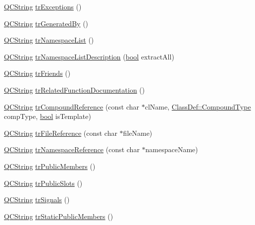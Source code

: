 \begin{DoxyCompactItemize}
\hyperlink{class_q_c_string}{Q\+C\+String} \hyperlink{class_translator_dutch_a09d71e3b824a70eb9fd4c82767b0999c}{tr\+Exceptions} ()
\item 
\hyperlink{class_q_c_string}{Q\+C\+String} \hyperlink{class_translator_dutch_a7069523f32ad0fe70e3a55466aef5945}{tr\+Generated\+By} ()
\item 
\hyperlink{class_q_c_string}{Q\+C\+String} \hyperlink{class_translator_dutch_a3a25210caaddb1c707e23c208db2e0e0}{tr\+Namespace\+List} ()
\item 
\hyperlink{class_q_c_string}{Q\+C\+String} \hyperlink{class_translator_dutch_a0c2f67455d6f6c3ff7da3fed8ba90071}{tr\+Namespace\+List\+Description} (\hyperlink{qglobal_8h_a1062901a7428fdd9c7f180f5e01ea056}{bool} extract\+All)
\item 
\hyperlink{class_q_c_string}{Q\+C\+String} \hyperlink{class_translator_dutch_a91eb7105c9e6002339c7613c26efcb3d}{tr\+Friends} ()
\item 
\hyperlink{class_q_c_string}{Q\+C\+String} \hyperlink{class_translator_dutch_ae1672e1c0ee26b6397489ea591b29362}{tr\+Related\+Function\+Documentation} ()
\item 
\hyperlink{class_q_c_string}{Q\+C\+String} \hyperlink{class_translator_dutch_a256ebfe4667d1a200d25f17f6a35666f}{tr\+Compound\+Reference} (const char $\ast$cl\+Name, \hyperlink{class_class_def_ae70cf86d35fe954a94c566fbcfc87939}{Class\+Def\+::\+Compound\+Type} comp\+Type, \hyperlink{qglobal_8h_a1062901a7428fdd9c7f180f5e01ea056}{bool} is\+Template)
\item 
\hyperlink{class_q_c_string}{Q\+C\+String} \hyperlink{class_translator_dutch_ad61b212ecf3582fed9518b8bd47656ee}{tr\+File\+Reference} (const char $\ast$file\+Name)
\item 
\hyperlink{class_q_c_string}{Q\+C\+String} \hyperlink{class_translator_dutch_aa4ff7e31b373c9ec582e601346bdf0a3}{tr\+Namespace\+Reference} (const char $\ast$namespace\+Name)
\item 
\hyperlink{class_q_c_string}{Q\+C\+String} \hyperlink{class_translator_dutch_a303054815ed1813005d949136d84b8b6}{tr\+Public\+Members} ()
\item 
\hyperlink{class_q_c_string}{Q\+C\+String} \hyperlink{class_translator_dutch_ac609e5abc3148bbab1157f79ea0e0215}{tr\+Public\+Slots} ()
\item 
\hyperlink{class_q_c_string}{Q\+C\+String} \hyperlink{class_translator_dutch_a63f0a1e1b851405826290feaca6ff8c7}{tr\+Signals} ()
\item 
\hyperlink{class_q_c_string}{Q\+C\+String} \hyperlink{class_translator_dutch_a4802dd0d65e8d8df78cc0a09f85190d9}{tr\+Static\+Public\+Members} ()

\end{DoxyCompactItemize}
